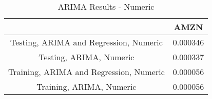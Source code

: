 \begin{table}[!h]
\caption{ARIMA Results - Numeric}
 \label{ARIMA Results - Numeric}
\captionsetup{justification=centering} 
 \begin{center}\begin{tabular}{|c|c|}\hline
{} &      AMZN \\ \hline
Testing, ARIMA and Regression, Numeric  &  0.000346 \\ \hline
Testing, ARIMA, Numeric                 &  0.000337 \\ \hline
Training, ARIMA and Regression, Numeric &  0.000056 \\ \hline
Training, ARIMA, Numeric                &  0.000056 \\ \hline
\end{tabular}
 \end{center}
\end{table}